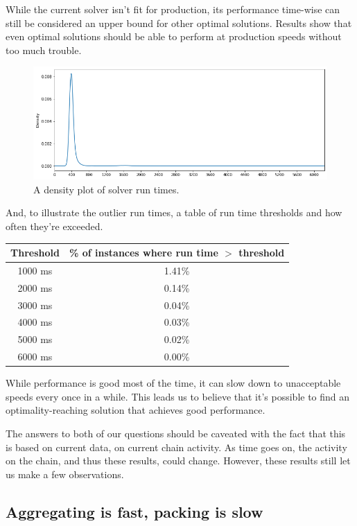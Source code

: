 \documentclass{article}
\begin{document}
While the current solver isn't fit for production, its performance time-wise
can still be considered an upper bound for other optimal solutions. Results
show that even optimal solutions should be able to perform at production speeds without
too much trouble.
%
\begin{figure}[!ht]
  \centering
  \includegraphics[width=1\textwidth]{mip_density.png}
  \caption{A density plot of solver run times.\label{fig:mip_density}}
\end{figure}
%

And, to illustrate the outlier run times, a table of run time thresholds and
how often they're exceeded.

\begin{center}
\begin{tabular}{ |c|c| }
  \hline
  Threshold & \% of instances where run time $>$ threshold \\
  \hline
  1000 ms & 1.41\% \\
  2000 ms & 0.14\% \\
  3000 ms & 0.04\% \\
  4000 ms & 0.03\% \\
  5000 ms & 0.02\% \\
  6000 ms & 0.00\% \\
  \hline
\end{tabular}
\end{center}

While performance is good most of the time, it can slow down to unacceptable
speeds every once in a while. This leads us to believe that it's possible to
find an optimality-reaching solution that achieves good performance.

The answers to both of our questions should be caveated with the fact that this
is based on current data, on current chain activity. As time goes on, the
activity on the chain, and thus these results, could change. However, these
results still let us make a few observations.

\subsection{Aggregating is fast, packing is slow}
\end{document}
